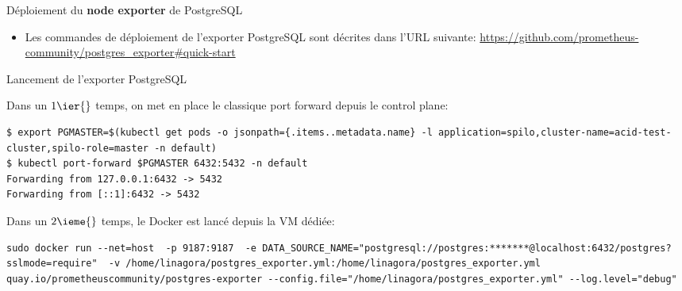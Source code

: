 
\begin{frame}[fragile]{Déploiement du \textbf{node exporter} de PostgreSQL}


\begin{itemize}
   \item Les commandes de déploiement de l'exporter PostgreSQL sont décrites dans l'URL suivante: \url{https://github.com/prometheus-community/postgres_exporter#quick-start}
\end{itemize}

\end{frame}


\begin{frame}[fragile]{Lancement de l'exporter PostgreSQL}

   Dans un $1\ier{}$ temps, on met en place le classique port forward depuis le control plane:
\begin{tiny}
\begin{Verbatim}[commandchars=\\\{\}]
$ export PGMASTER=$(kubectl get pods -o jsonpath={.items..metadata.name} -l application=spilo,cluster-name=acid-test-cluster,spilo-role=master -n default)
$ kubectl port-forward $PGMASTER 6432:5432 -n default
Forwarding from 127.0.0.1:6432 -> 5432
Forwarding from [::1]:6432 -> 5432
\end{Verbatim}
\end{tiny}

   Dans un $2\ieme{}$ temps, le Docker est lancé depuis la VM dédiée:

\begin{tiny}
\begin{Verbatim}[commandchars=\\\{\}]
sudo docker run --net=host  -p 9187:9187  -e DATA_SOURCE_NAME="postgresql://postgres:*******@localhost:6432/postgres?sslmode=require"  -v /home/linagora/postgres_exporter.yml:/home/linagora/postgres_exporter.yml quay.io/prometheuscommunity/postgres-exporter --config.file="/home/linagora/postgres_exporter.yml" --log.level="debug"
\end{Verbatim}
\end{tiny}

\end{frame}


